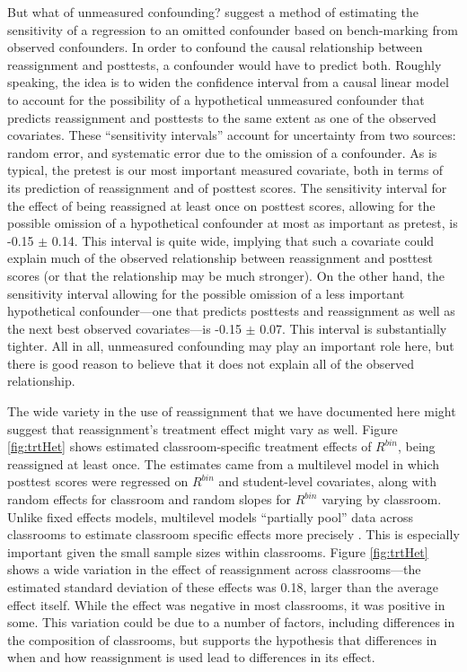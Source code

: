 \documentclass[12pt]{article}\usepackage[]{graphicx}\usepackage[]{color}
\begin{document}
But what of unmeasured confounding?
\citet{hhh} suggest a method of estimating the sensitivity of a regression to an omitted confounder based on bench-marking from observed confounders.
In order to confound the causal relationship between reassignment and posttests, a confounder would have to predict both.
Roughly speaking, the idea is to widen the confidence interval from a causal linear model to account for the possibility of a hypothetical unmeasured confounder that predicts reassignment and posttests to the same extent as one of the observed covariates.
These ``sensitivity intervals'' account for uncertainty from two sources: random error, and systematic error due to the omission of a confounder.
As is typical, the pretest is our most important measured covariate, both in terms of its prediction of reassignment and of posttest scores.
The sensitivity interval for the effect of being reassigned at least
once on posttest scores, allowing for the possible omission of a
hypothetical confounder at most as important as pretest, is
-0.15 $\pm$
0.14.
This interval is quite wide, implying that such a covariate could
explain much of the observed relationship between reassignment and
posttest scores (or that the relationship may be much stronger).
On the other hand, the sensitivity interval allowing for the possible
omission of a less important hypothetical confounder---one that
predicts posttests and reassignment as well as the next best observed
covariates---is
-0.15 $\pm$
0.07.
This interval is substantially tighter.
All in all, unmeasured confounding may play an important role here,
but there is good reason to believe that it does not explain all of
the observed relationship.

The wide variety in the use of reassignment that we have documented
here might suggest that reassignment's treatment effect might vary as
well.
Figure \ref{fig:trtHet} shows estimated classroom-specific treatment
effects of $R^{bin}$, being reassigned at least once.
The estimates came from a multilevel model in which posttest scores
were regressed on $R^{bin}$ and student-level covariates, along with
random effects for classroom and random slopes for $R^{bin}$ varying
by classroom.
Unlike fixed effects models, multilevel models ``partially pool'' data
across classrooms to estimate classroom specific effects more precisely \citep{gelmanHill}.
This is especially important given the small sample sizes within
classrooms.
Figure \ref{fig:trtHet} shows a wide variation in the effect of
reassignment across classrooms---the estimated standard deviation of
these effects was
0.18,
larger than the average effect itself.
While the effect was negative in most classrooms, it was positive in some.
This variation could be due to a number of factors, including
differences in the composition of classrooms, but supports the
hypothesis that differences in when and how reassignment is used
lead to differences in its effect.
\end{document}
